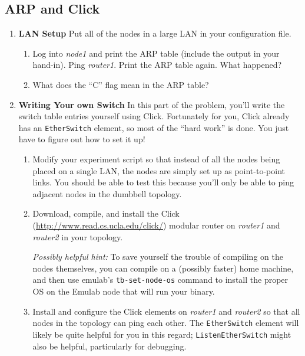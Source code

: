 \documentclass[11pt]{article}
\begin{document}
\subsection*{ARP and Click}

\begin{enumerate}
\itemsep=-1pt
\item{\bf LAN Setup} Put all of the nodes in a large LAN in your
  configuration file.  
  \begin{enumerate}
    \item Log into {\em node1} and print the ARP table (include the
      output in your hand-in).  Ping {\em router1}.  Print the ARP table
      again.  What happened?
    \item What does the ``C'' flag mean in the ARP table?
  \end{enumerate}

\item{\bf Writing Your own Switch} In this part of the problem, you'll
  write the switch table entries yourself using Click.  Fortunately for
  you, Click already has an {\tt EtherSwitch} element, so most of the
  ``hard work'' is done.  You just have to figure out how to set it up!

  \begin{enumerate}
    \item Modify your experiment script so that instead of all the nodes
      being placed on a single LAN, the nodes are simply set up as
      point-to-point links.  You should be able to test this because
      you'll only be able to ping adjacent nodes in the dumbbell
      topology.
    \item Download, compile, and install the Click
      (\url{http://www.read.cs.ucla.edu/click/}) modular
      router on {\em router1} and {\em router2} in your topology.

      {\em Possibly helpful hint:} To save yourself the trouble of
      compiling on the nodes themselves, you can compile on a (possibly
      faster) home machine, and then use emulab's {\tt tb-set-node-os}
      command to install the proper OS on the Emulab node that will run
      your binary.

    \item Install and configure the Click elements on {\em router1} and
      {\em router2} so that all nodes in the topology can ping each
      other.  The {\tt EtherSwitch} element will likely be quite helpful
      for you in this regard; {\tt ListenEtherSwitch} might also be
      helpful, particularly for debugging.
  \end{enumerate}


\end{enumerate}
\end{document}
